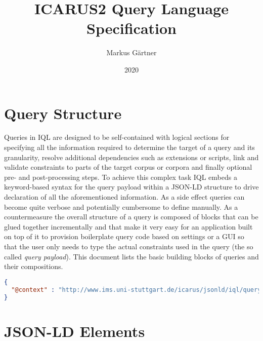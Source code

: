 \documentclass[11pt]{article}
\title{ICARUS2 Query Language Specification}
\author{Markus Gärtner}
\date{2020}
\newcommand{\iql}{IQL\xspace}
\begin{document}
\maketitle

\tableofcontents

\section{Query Structure}
\label{sec:query-structure}

Queries in \iql are designed to be self-contained with logical sections for specifying all the information required to determine the target of a query and its granularity, resolve additional dependencies such as extensions or scripts, link and validate constraints to parts of the target corpus or corpora and finally optional pre- and post-processing steps.
To achieve this complex task \iql embeds a keyword-based syntax for the query payload within a JSON-LD structure to drive declaration of all the aforementioned information. 
As a side effect queries can become quite verbose and potentially cumbersome to define manually. 
As a countermeasure the overall structure of a query is composed of blocks that can be glued together incrementally and that make it very easy for an application built on top of it to provision boilerplate query code based on settings or a GUI so that the user only needs to type the actual constraints used in the query (the so called \textit{query payload}). 
This document lists the basic building blocks of queries and their compositions.

\begin{lstlisting}[language=json]
{
  "@context" : "http://www.ims.uni-stuttgart.de/icarus/jsonld/iql/query" 
}
\end{lstlisting}


\section{JSON-LD Elements}
\label{sec:elements}


\end{document}

